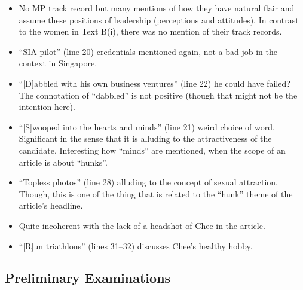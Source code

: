 \documentclass[../main.tex]{subfiles}
\begin{document}
\begin{itemize}
\begin{itemize}
						\item No MP track record but many mentions of how they have natural flair and assume these positions of leadership (perceptions and attitudes). In contrast to the women in Text B(i), there was no mention of their track records.
						\item ``SIA pilot'' (line 20) credentials mentioned again, not a bad job in the context in Singapore. 
						\item ``[D]abbled with his own business ventures'' (line 22) he could have failed? The connotation of ``dabbled'' is not positive (though that might not be the intention here).
						\item ``[S]wooped into the hearts and minds'' (line 21) weird choice of word. Significant in the sense that it is alluding to the attractiveness of the candidate. Interesting how ``minds'' are mentioned, when the scope of an article is about ``hunks''.
						\item ``Topless photos'' (line 28) alluding to the concept of sexual attraction. Though, this is one of the thing that is related to the ``hunk'' theme of the article's headline.
						\item Quite incoherent with the lack of a headshot of Chee in the article.
						\item ``[R]un triathlons'' (lines 31--32) discusses Chee's healthy hobby.
					\end{itemize}
				\end{itemize}

		\subsection*{Preliminary Examinations}
\end{document}
